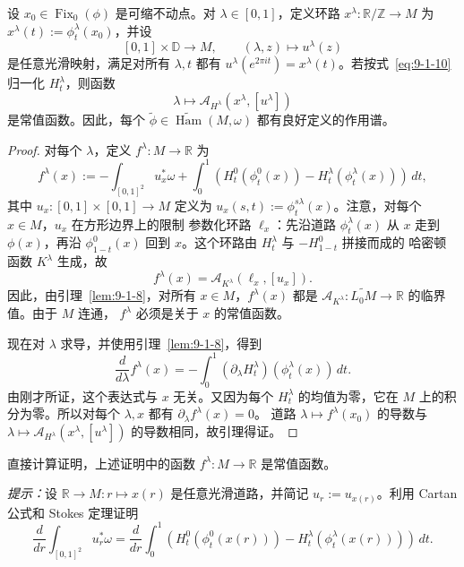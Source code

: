 \begin{lemma}\label{lem:9-1-9}
设 $x_0\in\operatorname{Fix}_0(\phi)$ 是可缩不动点。对
$\lambda\in[0,1]$，定义环路
$x^\lambda:\mathbb R/\mathbb Z\to M$ 为
$x^\lambda(t):=\phi_t^\lambda(x_0)$，并设
\[
  [0,1]\times\mathbb D\longrightarrow M,
  \qquad (\lambda,z)\longmapsto u^\lambda(z)
\]
是任意光滑映射，满足对所有 $\lambda,t$ 都有
$u^\lambda(e^{2\pi it})=x^\lambda(t)$。若按式~\eqref{eq:9-1-10} 归一化
$H_t^\lambda$，则函数
\[
  \lambda\longmapsto\mathcal A_{H^\lambda}(x^\lambda,[u^\lambda])
\]
是常值函数。因此，每个
$\widetilde\phi\in\widetilde{\operatorname{Ham}}(M,\omega)$ 都有良好定义的作用谱。
\end{lemma}

\begin{proof}
对每个 $\lambda$，定义 $f^\lambda:M\to\mathbb R$ 为
\[
  f^\lambda(x):=-\int_{[0,1]^2}u_x^*\omega
  +\int_0^1\left(
    H_t^0(\phi_t^0(x))-H_t^\lambda(\phi_t^\lambda(x))
  \right)\,dt,
\]
其中 $u_x:[0,1]\times[0,1]\to M$ 定义为
$u_x(s,t):=\phi_t^{s\lambda}(x)$。注意，对每个 $x\in M$，$u_x$ 在方形边界上的限制
参数化环路 $\ell_x$：先沿道路 $\phi_t^\lambda(x)$ 从 $x$ 走到 $\phi(x)$，再沿
$\phi_{1-t}^0(x)$ 回到 $x$。这个环路由 $H_t^\lambda$ 与 $-H_{1-t}^0$ 拼接而成的
哈密顿函数 $K^\lambda$ 生成，故
\[
  f^\lambda(x)=\mathcal A_{K^\lambda}(\ell_x,[u_x]).
\]
因此，由引理~\ref{lem:9-1-8}，对所有 $x\in M$，$f^\lambda(x)$ 都是
$\mathcal A_{K^\lambda}:\widetilde{L_0M}\to\mathbb R$ 的临界值。由于 $M$ 连通，
$f^\lambda$ 必须是关于 $x$ 的常值函数。

现在对 $\lambda$ 求导，并使用引理~\ref{lem:9-1-8}，得到
\[
  \frac d{d\lambda}f^\lambda(x)
  =-\int_0^1(\partial_\lambda H_t^\lambda)(\phi_t^\lambda(x))\,dt.
\]
由刚才所证，这个表达式与 $x$ 无关。又因为每个 $H_t^\lambda$ 的均值为零，它在 $M$
上的积分为零。所以对每个 $\lambda,x$ 都有 $\partial_\lambda f^\lambda(x)=0$。
道路 $\lambda\mapsto f^\lambda(x_0)$ 的导数与
$\lambda\mapsto\mathcal A_{H^\lambda}(x^\lambda,[u^\lambda])$ 的导数相同，故引理得证。
\end{proof}

\begin{exercise}\label{ex:9-1-10}
直接计算证明，上述证明中的函数 $f^\lambda:M\to\mathbb R$ 是常值函数。

\emph{提示：}设 $\mathbb R\to M:r\mapsto x(r)$ 是任意光滑道路，并简记
$u_r:=u_{x(r)}$。利用 Cartan 公式和 Stokes 定理证明
\[
  \frac d{dr}\int_{[0,1]^2}u_r^*\omega
  =\frac d{dr}\int_0^1\left(
    H_t^0(\phi_t^0(x(r)))-H_t^\lambda(\phi_t^\lambda(x(r)))
  \right)\,dt.
\]
\end{exercise}

